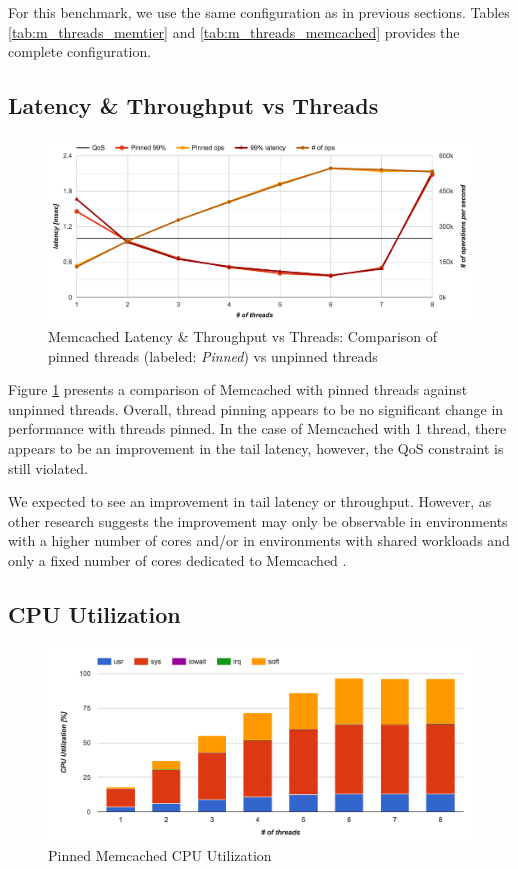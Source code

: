 For this benchmark, we use the same configuration as in previous sections. Tables \ref{tab:m_threads_memtier} and \ref{tab:m_threads_memcached} provides the complete configuration.

\subsection{Latency \& Throughput vs Threads}

\begin{figure}[h]
    \includegraphics[width=\textwidth]{./res2/m_pinning_latency.png}
    \caption{Memcached Latency \& Throughput vs Threads: Comparison of pinned threads (labeled: \textit{Pinned}) vs unpinned threads}
    \label{fig:m_pinning_latency}
\end{figure}

Figure \ref{fig:m_pinning_latency} presents a comparison of Memcached with pinned threads against unpinned threads. Overall, thread pinning appears to be no significant change in performance with threads pinned. In the case of Memcached with 1 thread, there appears to be an improvement in the tail latency, however, the QoS constraint is still violated.

We expected to see an improvement in tail latency or throughput. However, as other research suggests the improvement may only be observable in environments with a higher number of cores and/or in environments with shared workloads and only a fixed number of cores dedicated to Memcached \cite{solarflarememcached}.

\subsection{CPU Utilization}

\begin{figure}[h]
    \includegraphics[width=\textwidth]{./res2/m_pinning_cpu.png}
    \caption{Pinned Memcached CPU Utilization}
    \label{fig:m_pinning_cpu}
\end{figure}

